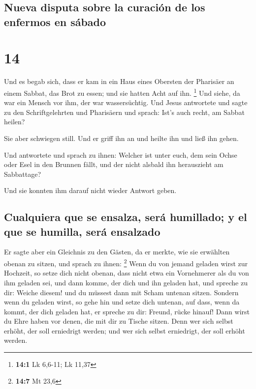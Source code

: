 \hypertarget{nueva-disputa-sobre-la-curaciuxf3n-de-los-enfermos-en-suxe1bado}{%
\subsection{Nueva disputa sobre la curación de los enfermos en
sábado}\label{nueva-disputa-sobre-la-curaciuxf3n-de-los-enfermos-en-suxe1bado}}

\hypertarget{section-13}{%
\section{14}\label{section-13}}

 Und es begab sich, dass er kam in ein Haus eines Obersten
der Pharisäer an einem Sabbat, das Brot zu essen; und sie hatten Acht
auf ihn. \footnote{\textbf{14:1} Lk 6,6-11; Lk 11,37}  Und
siehe, da war ein Mensch vor ihm, der war wassersüchtig. 
Und Jesus antwortete und sagte zu den Schriftgelehrten und Pharisäern
und sprach: Ist's auch recht, am Sabbat heilen?

 Sie aber schwiegen still. Und er griff ihn an und heilte
ihn und ließ ihn gehen.

 Und antwortete und sprach zu ihnen: Welcher ist unter
euch, dem sein Ochse oder Esel in den Brunnen fällt, und der nicht
alsbald ihn herauszieht am Sabbattage?

 Und sie konnten ihm darauf nicht wieder Antwort geben.

\hypertarget{cualquiera-que-se-ensalza-seruxe1-humillado-y-el-que-se-humilla-seruxe1-ensalzado}{%
\subsection{Cualquiera que se ensalza, será humillado; y el que se
humilla, será
ensalzado}\label{cualquiera-que-se-ensalza-seruxe1-humillado-y-el-que-se-humilla-seruxe1-ensalzado}}

 Er sagte aber ein Gleichnis zu den Gästen, da er merkte,
wie sie erwählten obenan zu sitzen, und sprach zu ihnen: \footnote{\textbf{14:7}
  Mt 23,6}  Wenn du von jemand geladen wirst zur Hochzeit,
so setze dich nicht obenan, dass nicht etwa ein Vornehmerer als du von
ihm geladen sei,  und dann komme, der dich und ihn geladen
hat, und spreche zu dir: Weiche diesem! und du müssest dann mit Scham
untenan sitzen.  Sondern wenn du geladen wirst, so gehe
hin und setze dich untenan, auf dass, wenn da kommt, der dich geladen
hat, er spreche zu dir: Freund, rücke hinauf! Dann wirst du Ehre haben
vor denen, die mit dir zu Tische sitzen.  Denn wer sich
selbst erhöht, der soll erniedrigt werden; und wer sich selbst
erniedrigt, der soll erhöht werden.

